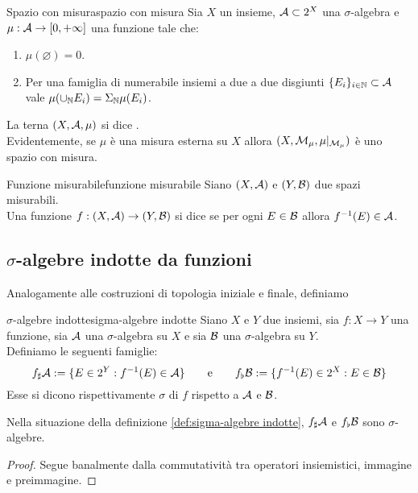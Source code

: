 \documentclass{article}
\renewcommand\A{\mc{A}}
\begin{document}
\begin{definition}{Spazio con misura}{spazio con misura}
    Sia $X$ un insieme, $\A \subset 2^X$ una $\sigma$-algebra e $\mu: \A \to [0, +\infty]$ una funzione tale che:\begin{enumerate}
        \item $\mu(\varnothing) = 0$.
        \item Per una famiglia di numerabile insiemi a due a due disgiunti $\{E_i\}_{i \in \N}\subset \A$ vale $\mu(\cup_{\mathbb{N}} E_i) = \Sigma_{\mathbb{N}} \mu(E_i)$.
    \end{enumerate}
    La terna $(X,\A,\mu)$ si dice .\\
    Evidentemente, se $\mu$ è una misura esterna su $X$ allora $(X, \mathcal{M}_\mu, \mu|_{\mathcal{M}_\mu})$ è uno spazio con misura.
\end{definition}

\begin{definition}{Funzione misurabile}{funzione misurabile}
    Siano $(X,\A)$ e $(Y,\mathcal{B})$ due spazi misurabili.\\
    Una funzione $f: (X,\A)\to (Y,\B)$ si dice  se per ogni $E \in \mathcal{B}$ allora $f^{-1}(E) \in \A$.
\end{definition}

\subsection{$\sigma$-algebre indotte da funzioni}

Analogamente alle costruzioni di topologia iniziale e finale, definiamo 

\begin{definition}{$\sigma$-algebre indotte}{sigma-algebre indotte}
    Siano $X$ e $Y$ due insiemi, sia $f : X \to Y$ una funzione, sia $\A$ una $\sigma$-algebra su $X$ e sia $\mathcal{B}$ una $\sigma$-algebra su $Y$.\\
    Definiamo le seguenti famiglie:
    \[f_\sharp \A := \{E \in 2^Y : f^{-1}(E)\in \A\}\qquad \text{e}\qquad f_\flat\B := \{f^{-1}(E) \in 2^X : E \in \B \}\]
    Esse si dicono rispettivamente $\sigma$ di $f$ rispetto a $\A$ e $\mathcal{B}$.
\end{definition}

\begin{proposition}{}{}
    Nella situazione della definizione \ref{def:sigma-algebre indotte}, $f_\sharp\A$ e $f_\flat\mathcal{B}$ sono $\sigma$-algebre.
    \begin{proof}
        Segue banalmente dalla commutatività tra operatori insiemistici, immagine e preimmagine.
    \end{proof}
\end{proposition}
\end{document}
